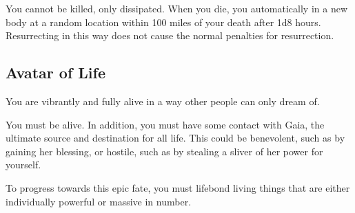        You cannot be killed, only dissipated.
      When you die, you automatically  in a new body at a random location within 100 miles of your death after 1d8 hours.
      Resurrecting in this way does not cause the normal penalties for resurrection.

  \subsection{Avatar of Life}
    You are vibrantly and fully alive in a way other people can only dream of.

     You must be alive.
    In addition, you must have some contact with Gaia, the ultimate source and destination for all life.
    This could be benevolent, such as by gaining her blessing, or hostile, such as by stealing a sliver of her power for yourself.

     To progress towards this epic fate, you must lifebond living things that are either individually powerful or massive in number.

